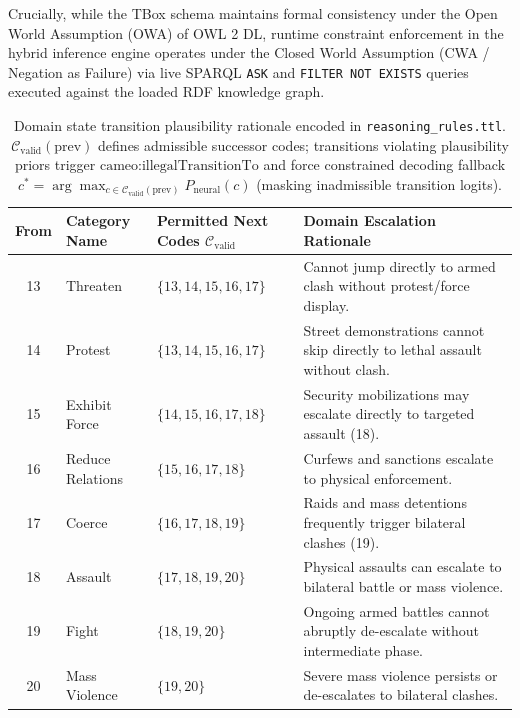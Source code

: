\documentclass[11pt,a4paper]{article}
\begin{document}
Crucially, while the TBox schema maintains formal consistency under the Open World Assumption (OWA) of OWL 2 DL, runtime constraint enforcement in the hybrid inference engine operates under the Closed World Assumption (CWA / Negation as Failure) via live SPARQL \texttt{ASK} and \texttt{FILTER NOT EXISTS} queries executed against the loaded RDF knowledge graph.

\begin{table}[h]
\centering
\small
\caption{Domain state transition plausibility rationale encoded in \texttt{reasoning\_rules.ttl}. $\mathcal{C}_{\text{valid}}(\text{prev})$ defines admissible successor codes; transitions violating plausibility priors trigger $\text{cameo:illegalTransitionTo}$ and force constrained decoding fallback $c^* = \arg\max_{c \in \mathcal{C}_{\text{valid}}(\text{prev})} P_{\text{neural}}(c)$ (masking inadmissible transition logits).}
\label{tab:transition_matrix}
\begin{tabular}{cllp{5cm}}
\toprule
\textbf{From} & \textbf{Category Name} & \textbf{Permitted Next Codes $\mathcal{C}_{\text{valid}}$} & \textbf{Domain Escalation Rationale} \\
\midrule
13 & Threaten & $\{13, 14, 15, 16, 17\}$ & Cannot jump directly to armed clash without protest/force display. \\
14 & Protest & $\{13, 14, 15, 16, 17\}$ & Street demonstrations cannot skip directly to lethal assault without clash. \\
15 & Exhibit Force & $\{14, 15, 16, 17, 18\}$ & Security mobilizations may escalate directly to targeted assault (18). \\
16 & Reduce Relations & $\{15, 16, 17, 18\}$ & Curfews and sanctions escalate to physical enforcement. \\
17 & Coerce & $\{16, 17, 18, 19\}$ & Raids and mass detentions frequently trigger bilateral clashes (19). \\
18 & Assault & $\{17, 18, 19, 20\}$ & Physical assaults can escalate to bilateral battle or mass violence. \\
19 & Fight & $\{18, 19, 20\}$ & Ongoing armed battles cannot abruptly de-escalate without intermediate phase. \\
20 & Mass Violence & $\{19, 20\}$ & Severe mass violence persists or de-escalates to bilateral clashes. \\
\bottomrule
\end{tabular}
\end{table}
\end{document}
